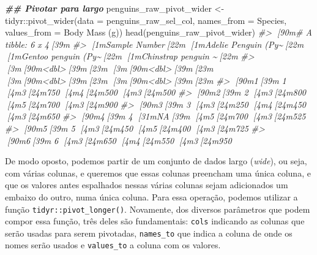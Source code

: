 \documentclass[
]{book}
\newenvironment{Shaded}{\begin{snugshade}}{\end{snugshade}}
\newcommand{\AttributeTok}[1]{\textcolor[rgb]{0.61,0.61,0.61}{#1}}
\newcommand{\CommentTok}[1]{\textcolor[rgb]{0.37,0.37,0.37}{\textit{#1}}}
\newcommand{\DocumentationTok}[1]{\textcolor[rgb]{0.37,0.37,0.37}{\textbf{\textit{#1}}}}
\newcommand{\FunctionTok}[1]{\textcolor[rgb]{0,0,0}{#1}}
\newcommand{\NormalTok}[1]{#1}
\newcommand{\OtherTok}[1]{\textcolor[rgb]{0.37,0.37,0.37}{#1}}
\newcommand{\SpecialCharTok}[1]{\textcolor[rgb]{0,0,0}{#1}}
\newcommand{\StringTok}[1]{\textcolor[rgb]{0.5,0.5,0.5}{#1}}
\begin{document}
\begin{Shaded}
\begin{Highlighting}[]
\DocumentationTok{\#\# Pivotar para largo}
\NormalTok{penguins\_raw\_pivot\_wider }\OtherTok{\textless{}{-}}\NormalTok{ tidyr}\SpecialCharTok{::}\FunctionTok{pivot\_wider}\NormalTok{(}\AttributeTok{data =}\NormalTok{ penguins\_raw\_sel\_col, }
                                               \AttributeTok{names\_from =}\NormalTok{ Species, }
                                               \AttributeTok{values\_from =} \StringTok{\textasciigrave{}}\AttributeTok{Body Mass (g)}\StringTok{\textasciigrave{}}\NormalTok{)}
\FunctionTok{head}\NormalTok{(penguins\_raw\_pivot\_wider)}
\CommentTok{\#\textgreater{} [90m\# A tibble: 6 x 4[39m}
\CommentTok{\#\textgreater{}   [1m\textasciigrave{}Sample Number\textasciigrave{}[22m [1m\textasciigrave{}Adelie Penguin (Py\textasciitilde{}[22m [1m\textasciigrave{}Gentoo penguin (Py\textasciitilde{}[22m [1m\textasciigrave{}Chinstrap penguin \textasciitilde{}[22m}
\CommentTok{\#\textgreater{}             [3m[90m\textless{}dbl\textgreater{}[39m[23m                [3m[90m\textless{}dbl\textgreater{}[39m[23m                [3m[90m\textless{}dbl\textgreater{}[39m[23m                [3m[90m\textless{}dbl\textgreater{}[39m[23m}
\CommentTok{\#\textgreater{} [90m1[39m               1                 [4m3[24m750                 [4m4[24m500                 [4m3[24m500}
\CommentTok{\#\textgreater{} [90m2[39m               2                 [4m3[24m800                 [4m5[24m700                 [4m3[24m900}
\CommentTok{\#\textgreater{} [90m3[39m               3                 [4m3[24m250                 [4m4[24m450                 [4m3[24m650}
\CommentTok{\#\textgreater{} [90m4[39m               4                   [31mNA[39m                 [4m5[24m700                 [4m3[24m525}
\CommentTok{\#\textgreater{} [90m5[39m               5                 [4m3[24m450                 [4m5[24m400                 [4m3[24m725}
\CommentTok{\#\textgreater{} [90m6[39m               6                 [4m3[24m650                 [4m4[24m550                 [4m3[24m950}
\end{Highlighting}
\end{Shaded}

De modo oposto, podemos partir de um conjunto de dados largo (\emph{wide}), ou seja, com várias colunas, e queremos que essas colunas preencham uma única coluna, e que os valores antes espalhados nessas várias colunas sejam adicionados um embaixo do outro, numa única coluna. Para essa operação, podemos utilizar a função \texttt{tidyr::pivot\_longer()}. Novamente, dos diversos parâmetros que podem compor essa função, três deles são fundamentais: \texttt{cols} indicando as colunas que serão usadas para serem pivotadas, \texttt{names\_to} que indica a coluna de onde os nomes serão usados e \texttt{values\_to} a coluna com os valores.
\end{document}
